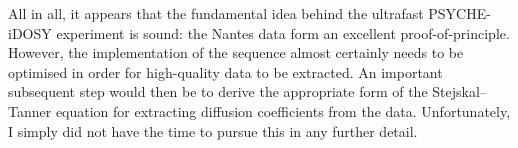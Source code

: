 All in all, it appears that the fundamental idea behind the ultrafast PSYCHE-iDOSY experiment is sound: the Nantes data form an excellent proof-of-principle.
However, the implementation of the sequence almost certainly needs to be optimised in order for high-quality data to be extracted.
An important subsequent step would then be to derive the appropriate form of the Stejskal--Tanner equation for extracting diffusion coefficients from the data.
Unfortunately, I simply did not have the time to pursue this in any further detail.
